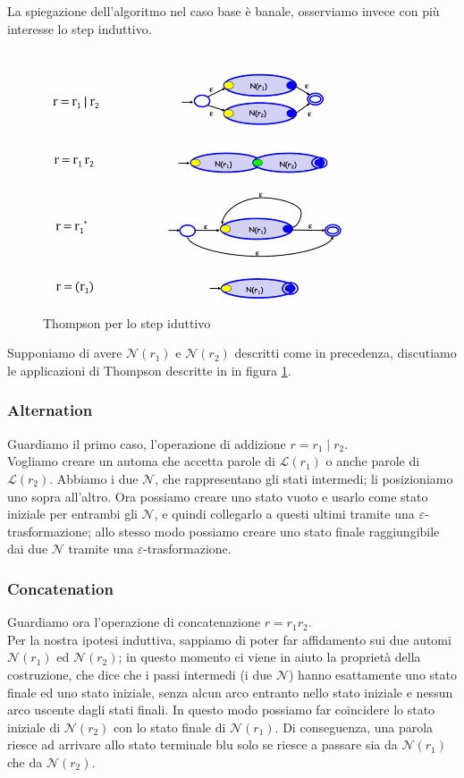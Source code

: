 \documentclass[class=book, crop=false, oneside, 12pt]{standalone}
\begin{document}
\noindent La spiegazione dell'algoritmo nel caso base è banale, osserviamo invece con più interesse lo step induttivo.

\begin{figure}
    \centering
    \includegraphics[width=.7\textwidth,keepaspectratio]{Thompson_step}
    \caption{Thompson per lo step iduttivo}
    \label{Thompson_step}
\end{figure}
Supponiamo di avere \(\mathcal{N}(r_1)\) e \(\mathcal{N}(r_2)\) descritti come in precedenza, discutiamo le applicazioni di Thompson descritte in in figura \ref{Thompson_step}.

\subsubsection{Alternation}
Guardiamo il primo caso, l'operazione di addizione \(r = r_1 \mid r_2\).\\
Vogliamo creare un automa che accetta parole di \(\mathcal{L}(r_1)\) o anche parole di \(\mathcal{L}(r_2)\).
Abbiamo i due \(\mathcal{N}\), che rappresentano gli stati intermedi; li posizioniamo uno sopra all’altro. Ora possiamo creare uno stato vuoto e usarlo come stato iniziale per entrambi gli \(\mathcal{N}\), e quindi collegarlo a questi ultimi tramite una \(\varepsilon\)-trasformazione; allo stesso modo possiamo creare uno stato finale raggiungibile dai due \(\mathcal{N}\) tramite una \(\varepsilon\)-trasformazione.

\subsubsection{Concatenation}
Guardiamo ora l’operazione di concatenazione \(r = r_1 r_2\).\\
Per la nostra ipotesi induttiva, sappiamo di poter far affidamento sui due automi \(\mathcal{N}(r_1)\) ed \(\mathcal{N}(r_2)\); in questo momento ci viene in aiuto la proprietà della costruzione, che dice che i passi intermedi (i due \(\mathcal{N}\)) hanno esattamente uno stato finale ed uno stato iniziale, senza alcun arco entranto nello stato iniziale e nessun arco uscente dagli stati finali. 
In questo modo possiamo far coincidere lo stato iniziale di \(\mathcal{N}(r_2)\) con lo stato finale di \(\mathcal{N}(r_1)\). 
Di conseguenza, una parola riesce ad arrivare allo stato terminale blu solo se riesce a passare sia da \(\mathcal{N}(r_1)\) che da \(\mathcal{N}(r_2)\).
\end{document}
